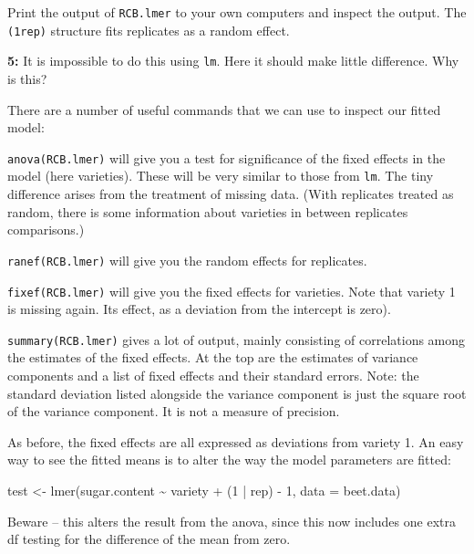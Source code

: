 \documentclass[
]{book}
\makeatletter
\newenvironment{Shaded}{\begin{snugshade}}{\end{snugshade}}
\newcommand{\AttributeTok}[1]{\textcolor[rgb]{0.77,0.63,0.00}{#1}}
\newcommand{\DecValTok}[1]{\textcolor[rgb]{0.00,0.00,0.81}{#1}}
\newcommand{\FunctionTok}[1]{\textcolor[rgb]{0.00,0.00,0.00}{#1}}
\newcommand{\NormalTok}[1]{#1}
\newcommand{\OtherTok}[1]{\textcolor[rgb]{0.56,0.35,0.01}{#1}}
\newcommand{\SpecialCharTok}[1]{\textcolor[rgb]{0.00,0.00,0.00}{#1}}
\newenvironment{kframe}{%
\medskip{}
\setlength{\fboxsep}{.8em}
 \def\at@end@of@kframe{}%
 \ifinner\ifhmode%
  \def\at@end@of@kframe{\end{minipage}}%
  \begin{minipage}{\columnwidth}%
 \fi\fi%
 \def\FrameCommand##1{\hskip\@totalleftmargin \hskip-\fboxsep
 \colorbox{shadecolor}{##1}\hskip-\fboxsep
     \hskip-\linewidth \hskip-\@totalleftmargin \hskip\columnwidth}%
 \MakeFramed {\advance\hsize-\width
   \@totalleftmargin\z@ \linewidth\hsize
   \@setminipage}}%
 {\par\unskip\endMakeFramed%
 \at@end@of@kframe}
\newenvironment{rmdblock}[1]
  {
  \begin{itemize}
  \renewcommand{\labelitemi}{
    \raisebox{-.7\height}[0pt][0pt]{
      {\setkeys{Gin}{width=3em,keepaspectratio}\texttt{[image: images/\#1]}}
    }
  }
  \setlength{\fboxsep}{1em}
  \begin{kframe}
  \item
  }
  {
  \end{kframe}
  \end{itemize}
  }
\newenvironment{rmdquiz}
  {\begin{rmdblock}{quiz}}
  {\end{rmdblock}}
\newenvironment{rmdcaution}
  {\begin{rmdblock}{caution}}
  {\end{rmdblock}}
\makeatother
\begin{document}
Print the output of \texttt{RCB.lmer} to your own computers and inspect the output. The \texttt{(1\textbar{}rep)} structure fits replicates as a random effect.

\begin{rmdquiz}
\textbf{5:}
It is impossible to do this using \texttt{lm}. Here it should make little difference. Why is this?
\end{rmdquiz}

There are a number of useful commands that we can use to inspect our fitted model:

\texttt{anova(RCB.lmer)} will give you a test for significance of the fixed effects in the model (here varieties). These will be very similar to those from \texttt{lm}. The tiny difference arises from the treatment of missing data. (With replicates treated as random, there is some information about varieties in between replicates comparisons.)

\texttt{ranef(RCB.lmer)} will give you the random effects for replicates.

\texttt{fixef(RCB.lmer)} will give you the fixed effects for varieties. Note that variety 1 is missing again. Its effect, as a deviation from the intercept is zero).

\texttt{summary(RCB.lmer)} gives a lot of output, mainly consisting of correlations among the estimates of the fixed effects. At the top are the estimates of variance components and a list of fixed effects and their standard errors. Note: the standard deviation listed alongside the variance component is just the square root of the variance component. It is not a measure of precision.

As before, the fixed effects are all expressed as deviations from variety 1. An easy way to see the fitted means is to alter the way the model parameters are fitted:

\begin{Shaded}
\begin{Highlighting}[]
\NormalTok{test }\OtherTok{\textless{}{-}} \FunctionTok{lmer}\NormalTok{(sugar.content }\SpecialCharTok{\textasciitilde{}}\NormalTok{ variety }\SpecialCharTok{+}\NormalTok{ (}\DecValTok{1} \SpecialCharTok{|}\NormalTok{ rep) }\SpecialCharTok{{-}} \DecValTok{1}\NormalTok{, }\AttributeTok{data =}\NormalTok{ beet.data)}
\end{Highlighting}
\end{Shaded}

\begin{rmdcaution}
Beware -- this alters the result from the anova, since this now includes one extra df testing for the difference of the mean from zero.
\end{rmdcaution}
\end{document}
